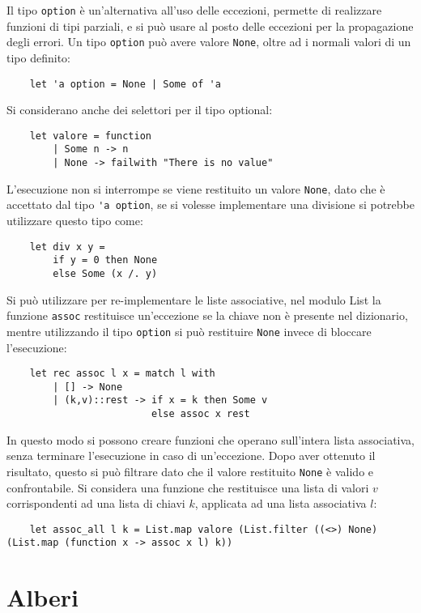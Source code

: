 \documentclass{article}
\numberwithin{equation}{subsection}
\begin{document}
Il tipo \verb|option| è un'alternativa all'uso delle eccezioni, permette di realizzare funzioni di tipi parziali, e si può usare al posto delle eccezioni per la propagazione degli errori. Un tipo \verb|option| può avere valore \verb|None|, oltre ad i normali valori di un tipo definito:
\begin{verbatim}
    let 'a option = None | Some of 'a    
\end{verbatim}
Si considerano anche dei selettori per il tipo optional:
\begin{verbatim}
    let valore = function
        | Some n -> n
        | None -> failwith "There is no value"
\end{verbatim}
L'esecuzione non si interrompe se viene restituito un valore \verb|None|, dato che è accettato dal tipo \verb|'a option|, se si volesse implementare una divisione si potrebbe utilizzare questo tipo come:
\begin{verbatim}
    let div x y =
        if y = 0 then None
        else Some (x /. y)    
\end{verbatim}

Si può utilizzare per re-implementare le liste associative, nel modulo List la funzione \verb|assoc| restituisce un'eccezione se la chiave non è presente nel dizionario, mentre utilizzando il tipo \verb|option| si può restituire \verb|None| invece di bloccare l'esecuzione:
\begin{verbatim}
    let rec assoc l x = match l with
        | [] -> None
        | (k,v)::rest -> if x = k then Some v
                         else assoc x rest
\end{verbatim}

In questo modo si possono creare funzioni che operano sull'intera lista associativa, senza terminare l'esecuzione in caso di un'eccezione. Dopo aver ottenuto il risultato, questo si può filtrare dato che il valore restituito \verb|None| è valido e confrontabile. 
Si considera una funzione che restituisce una lista di valori $v$ corrispondenti ad una lista di chiavi $k$, applicata ad una lista associativa $l$:
\begin{verbatim}
    let assoc_all l k = List.map valore (List.filter ((<>) None) (List.map (function x -> assoc x l) k))
\end{verbatim}

\clearpage

\section{Alberi}
\end{document}
